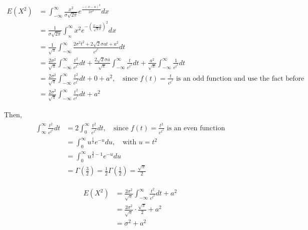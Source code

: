 \documentclass[UTF8]{article}
\begin{document}
\begin{enumerate}
            \begin{equation*}
                \begin{split}
                    E(X^2) &= \int_{-\infty}^\infty\frac{x^2}{\sigma\sqrt{2\pi}}e^{\frac{-(x-a)^2}{2\sigma^2}}dx\\
                    &=\frac{1}{\sigma\sqrt{2\pi}}\int_{_\infty}^\infty x^2e^{-(\frac{x-a}{\sqrt{2}\sigma})^2}dx \\
                    &=\frac{1}{\sqrt{\pi}}\int^\infty_{-\infty}\frac{2\sigma^2t^2+2\sqrt{2}\sigma at+a^2}{e^{t^2}}dt\\
                    &=\frac{2\sigma^2}{\sqrt{\pi}}\int^\infty_{-\infty}\frac{t^2}{e^{t^2}}dt+\frac{2\sqrt{2}\sigma a}{\sqrt{\pi}}\int^\infty_{-\infty}\frac{t}{e^{t^2}}dt+\frac{a^2}{\sqrt{\pi}}\int^\infty_{-\infty}\frac{1}{e^{t^2}}dt\\
                    &= \frac{2\sigma^2}{\sqrt{\pi}}\int^\infty_{-\infty}\frac{t^2}{e^{t^2}}dt + 0 + a^2,\quad\text{since $f(t)=\frac{t}{e^{t^2}}$ is an odd function and use the fact before}\\
                    &=\frac{2\sigma^2}{\sqrt{\pi}}\int^\infty_{-\infty}\frac{t^2}{e^{t^2}}dt + a^2
                \end{split}
            \end{equation*}
            
            Then, 
            \begin{equation*}
                \begin{split}
                    \begin{split}
                        \int^\infty_{\infty}\frac{t^2}{e^{t^2}}dt &=2\int_0^\infty\frac{t^2}{e^{t^2}}dt,\quad\text{since $f(t)=\frac{t^2}{e^{t^2}}$ is an even function}\\
                         &=\int_0^\infty u^{\frac{1}{2}}e^{-u}du,\quad\text{with $u=t^2$}\\
                         &=\int_0^\infty u^{\frac{3}{2}-1}e^{-u}du\\
                         &=\Gamma(\frac{3}{2})=\frac{1}{2}\Gamma(\frac{1}{2})=\frac{\sqrt{\pi}}{2}
                    \end{split}
                \end{split}
            \end{equation*}

            
            \begin{equation*}
                \begin{split}
                    E(X^2)&=\frac{2\sigma^2}{\sqrt{\pi}}\int^\infty_{-\infty}\frac{t^2}{e^{t^2}}dt + a^2\\
                    &=\frac{2\sigma^2}{\sqrt{\pi}}\cdot\frac{\sqrt{\pi}}{2} +a^2\\
                    &=\sigma^2+a^2
                \end{split}
            \end{equation*}


\end{enumerate}
\end{document}
